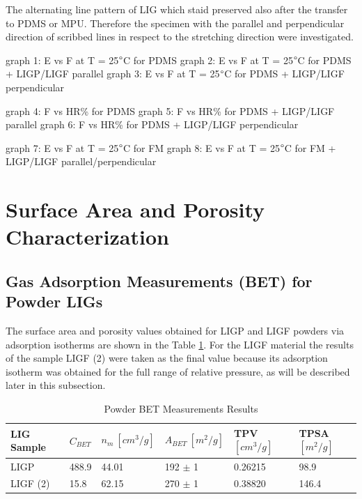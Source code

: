 The alternating line pattern of LIG which staid preserved also after the transfer to PDMS or MPU. Therefore the specimen with the parallel and perpendicular direction of scribbed lines in respect to the stretching direction were investigated.

graph 1: E vs F at T = 25$\degree$C for PDMS
graph 2: E vs F at T = 25$\degree$C for PDMS + LIGP/LIGF parallel
graph 3: E vs F at T = 25$\degree$C for PDMS + LIGP/LIGF perpendicular

graph 4: F vs HR\% for PDMS
graph 5: F vs HR\% for PDMS + LIGP/LIGF parallel
graph 6: F vs HR\% for PDMS + LIGP/LIGF perpendicular

graph 7: E vs F at T = 25$\degree$C for FM
graph 8: E vs F at T = 25$\degree$C for FM + LIGP/LIGF parallel/perpendicular



\section{Surface Area and Porosity Characterization}

\subsection{Gas Adsorption Measurements (BET) for Powder LIGs}

The surface area and porosity values obtained for LIGP and LIGF powders via adsorption isotherms are shown in the Table \ref{tab:powder_BET_results}. For the LIGF material the results of the sample LIGF (2) were taken as the final value because its adsorption isotherm was obtained for the full range of relative pressure, as will be described later in this subsection.

\begin{table}[H]
\centering
    \caption{Powder BET Measurements Results}
    \label{tab:powder_BET_results} 
\medskip
\medskip
\begin{tabular}{ l | l | l | l | l | l } 

LIG Sample &  $C_{BET}$ & $n_m\:[cm^3/g]$ & $A_{BET}\:[m^2/g]$ & TPV $[cm^3/g]$ & TPSA\footnotemark[1]  $[m^2/g]$\\[15px]
\hline

LIGP     & 488.9 & 44.01 & 192 $\displaystyle \pm$ 1 &  0.26215 & 98.9 \\[15px]

LIGF (2) & 15.8 & 62.15 & 270 $\displaystyle \pm$ 1  & 0.38820 & 146.4  \\[15px]


\end{tabular}
\end{table}

